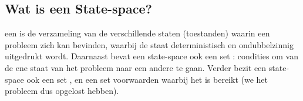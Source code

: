 \subsection{Wat is een State-space?}
een  is de verzameling van de verschillende staten (toestanden) waarin een probleem zich kan bevinden, waarbij de staat deterministisch en ondubbelzinnig uitgedrukt wordt. Daarnaast bevat een state-space ook een set : condities om van de ene staat van het probleem naar een andere te gaan. Verder bezit een state-space ook een set , en een set voorwaarden waarbij het  is bereikt (we het probleem dus opgelost hebben).
\paragraph{}
